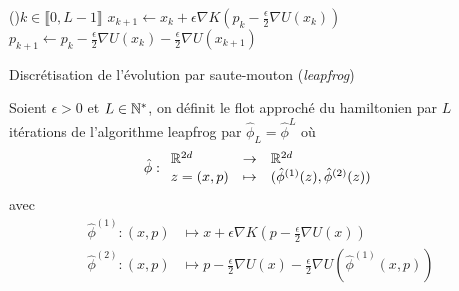 \documentclass[10pt,a4paper]{article}
\begin{document}

\begin{center}
	\begin{algorithm}[H]
		\For(){$k \in \llbracket 0, L-1 \rrbracket$}{
			$x_{k+1} \leftarrow x_k + \epsilon \nabla K \left( p_k - \frac{\epsilon}{2} \nabla U(x_k) \right)$\;
			$p_{k+1} \leftarrow p_k - \frac{\epsilon}{2} \nabla U(x_k) - \frac{\epsilon}{2} \nabla U(x_{k+1})$\;
		}
		\caption{Discrétisation de l'évolution par saute-mouton (\emph{leapfrog})}
		\label{algo:leapfrog}
	\end{algorithm}
\end{center}

\begin{Def} Soient $\epsilon > 0$ et $L \in \mathbb{N}^*$, on définit le flot approché du hamiltonien par $L$ itérations de l'algorithme leapfrog par $\hat{\phi}_L = \hat{\phi}^L$ où 
  $$
  \hat{\phi} : { \begin{array}{lcl} \mathbb{R}^{2d} & \to & \mathbb{R}^{2d} \\
    z = (x, p) & \mapsto & (\hat{\phi}^{(1)}(z), \hat{\phi}^{(2)}(z))
     \end{array} }
  $$
  avec
  \begin{align*}
    \hat{\phi}^{(1)} : (x,p) & \mapsto x + \epsilon \nabla K \left( p - \frac{\epsilon}{2} \nabla U(x) \right) \\
    \hat{\phi}^{(2)} : (x,p) & \mapsto p - \frac{\epsilon}{2} \nabla U(x) - \frac{\epsilon}{2} \nabla U(\hat{\phi}^{(1)}(x,p))
  \end{align*}
\end{Def}
\end{document}
